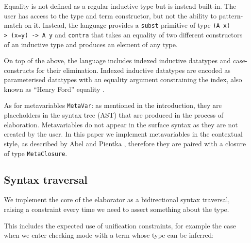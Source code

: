 Equality is not defined as a regular inductive type but is instead
built-in. The user has access to the type and term constructor, but not
the ability to pattern-match on it. Instead, the language provides a
\texttt{subst} primitive of type
\texttt{(A\ x)\ -\textgreater{}\ (x=y)\ -\textgreater{}\ A\ y} and
\texttt{contra} that takes an equality of two different constructors of
an inductive type and produces an element of any type.

On top of the above, the language includes indexed inductive datatypes
and case-constructs for their elimination. Indexed inductive datatypes
are encoded as parameterised datatypes with an equality argument
constraining the index, also known as ``Henry Ford'' equality
\citep{chapmanGentleArtLevitation2010a}.

As for metavariables \texttt{MetaVar}: as mentioned in the introduction,
they are placeholders in the syntax tree (AST) that are produced in the
process of elaboration. Metavariables do not appear in the surface
syntax as they are not created by the user. In this paper we implement
metavariables in the contextual style, as described by
Abel and Pientka \cite{abelHigherOrderDynamicPattern2011}, therefore they are paired
with a closure of type \texttt{MetaClosure}.

\hypertarget{syntax-traversal}{%
\subsection{Syntax traversal}\label{syntax-traversal}}

We implement the core of the elaborator as a bidirectional syntax
traversal, raising a constraint every time we need to assert something
about the type.

This includes the expected use of unification constraints, for example
the case when we enter checking mode with a term whose type can be
inferred:

\begin{imageonly}
\begin{Shaded}
\begin{Highlighting}[]
\OtherTok{=} 
\OtherTok{\textless{}{-}}
\end{Highlighting}
\end{Shaded}
\end{imageonly}

